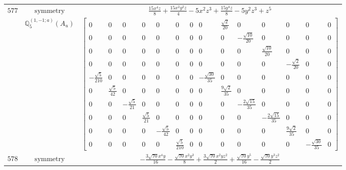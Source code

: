 \documentclass[fleqn,8pt,landscape]{jsarticle}
\begin{document}
\begin{longtable}{ccc}
$ 577 $ & $ \text{symmetry} $ & $ \frac{15 x^{4} z}{8} + \frac{15 x^{2} y^{2} z}{4} - 5 x^{2} z^{3} + \frac{15 y^{4} z}{8} - 5 y^{2} z^{3} + z^{5} $ \\
$  $ & $ \mathbb{Q}_{5}^{(1,-1;a)}(A_{u}) $ & $ \begin{bmatrix} 0 & 0 & 0 & 0 & 0 & 0 & 0 & 0 & \frac{\sqrt{2}}{20} & 0 & 0 & 0 & 0 & 0 \\ 0 & 0 & 0 & 0 & 0 & 0 & 0 & 0 & 0 & - \frac{\sqrt{10}}{20} & 0 & 0 & 0 & 0 \\ 0 & 0 & 0 & 0 & 0 & 0 & 0 & 0 & 0 & 0 & \frac{\sqrt{10}}{20} & 0 & 0 & 0 \\ 0 & 0 & 0 & 0 & 0 & 0 & 0 & 0 & 0 & 0 & 0 & - \frac{\sqrt{2}}{20} & 0 & 0 \\ - \frac{\sqrt{5}}{210} & 0 & 0 & 0 & 0 & 0 & 0 & - \frac{\sqrt{30}}{35} & 0 & 0 & 0 & 0 & 0 & 0 \\ 0 & \frac{\sqrt{5}}{42} & 0 & 0 & 0 & 0 & 0 & 0 & \frac{9 \sqrt{2}}{35} & 0 & 0 & 0 & 0 & 0 \\ 0 & 0 & - \frac{\sqrt{5}}{21} & 0 & 0 & 0 & 0 & 0 & 0 & - \frac{2 \sqrt{15}}{35} & 0 & 0 & 0 & 0 \\ 0 & 0 & 0 & \frac{\sqrt{5}}{21} & 0 & 0 & 0 & 0 & 0 & 0 & - \frac{2 \sqrt{15}}{35} & 0 & 0 & 0 \\ 0 & 0 & 0 & 0 & - \frac{\sqrt{5}}{42} & 0 & 0 & 0 & 0 & 0 & 0 & \frac{9 \sqrt{2}}{35} & 0 & 0 \\ 0 & 0 & 0 & 0 & 0 & \frac{\sqrt{5}}{210} & 0 & 0 & 0 & 0 & 0 & 0 & - \frac{\sqrt{30}}{35} & 0 \end{bmatrix} $ \\ \hline
$ 578 $ & $ \text{symmetry} $ & $ - \frac{3 \sqrt{70} x^{4} y}{16} - \frac{\sqrt{70} x^{2} y^{3}}{8} + \frac{3 \sqrt{70} x^{2} y z^{2}}{2} + \frac{\sqrt{70} y^{5}}{16} - \frac{\sqrt{70} y^{3} z^{2}}{2} $ \\

\end{longtable}
\end{document}
